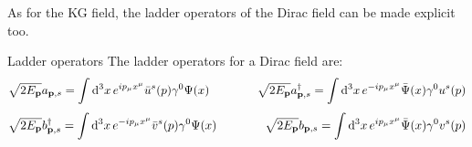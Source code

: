 As for the KG field, the ladder operators of the Dirac field can be made explicit too.

\begin{proposition}{Ladder operators}{}
  The ladder operators for a Dirac field are:
  \begin{equation}
    \sqrt{2E_{\mathbf{p}}} a_{\mathbf{p},s} = \int \mathrm{d}^3x\, e^{i p_\mu x^\mu} \bar{u}^s(p) \gamma^0 \Psi(x)
    \qquad \qquad
    \sqrt{2E_{\mathbf{p}}} a_{\mathbf{p},s}^\dagger = \int \mathrm{d}^3x\, e^{-i p_\mu x^\mu} \bar{\Psi}(x) \gamma^0 u^s(p)
    \label{eq:dirac-ladd-op-a}
  \end{equation}
  \begin{equation}
    \sqrt{2E_{\mathbf{p}}} b_{\mathbf{p},s}^\dagger = \int \mathrm{d}^3x\, e^{-i p_\mu x^\mu} \bar{v}^s(p) \gamma^0 \Psi(x)
    \qquad \qquad
    \sqrt{2E_{\mathbf{p}}} b_{\mathbf{p},s} = \int \mathrm{d}^3x\, e^{i p_\mu x^\mu} \bar{\Psi}(x) \gamma^0 v^s(p)
    \label{eq:dirac-ladd-op-b}
  \end{equation}
\end{proposition}

